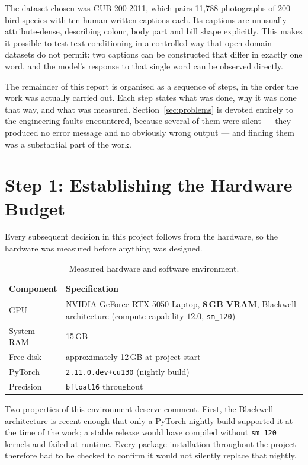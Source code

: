 \documentclass[11pt,a4paper]{article}
\newcommand{\step}[1]{\section{#1}}
\begin{document}
The dataset chosen was CUB-200-2011, which pairs 11{,}788 photographs of 200
bird species with ten human-written captions each. Its captions are unusually
attribute-dense, describing colour, body part and bill shape explicitly. This
makes it possible to test text conditioning in a controlled way that open-domain
datasets do not permit: two captions can be constructed that differ in exactly
one word, and the model's response to that single word can be observed directly.

The remainder of this report is organised as a sequence of steps, in the order
the work was actually carried out. Each step states what was done, why it was
done that way, and what was measured. Section~\ref{sec:problems} is devoted
entirely to the engineering faults encountered, because several of them were
silent --- they produced no error message and no obviously wrong output --- and
finding them was a substantial part of the work.

\step{Step 1: Establishing the Hardware Budget}

Every subsequent decision in this project follows from the hardware, so the
hardware was measured before anything was designed.

\begin{table}[htbp]
\centering
\caption{Measured hardware and software environment.}
\begin{tabularx}{0.92\textwidth}{@{}lX@{}}
\toprule
\textbf{Component} & \textbf{Specification} \\
\midrule
GPU & NVIDIA GeForce RTX 5050 Laptop, \textbf{8\,GB VRAM}, Blackwell architecture (compute capability $12.0$, \texttt{sm\_120}) \\
System RAM & 15\,GB \\
Free disk & approximately 12\,GB at project start \\
PyTorch & \texttt{2.11.0.dev+cu130} (nightly build) \\
Precision & \texttt{bfloat16} throughout \\
\bottomrule
\end{tabularx}
\end{table}

Two properties of this environment deserve comment. First, the Blackwell
architecture is recent enough that only a PyTorch nightly build supported it at
the time of the work; a stable release would have compiled without
\texttt{sm\_120} kernels and failed at runtime. Every package installation
throughout the project therefore had to be checked to confirm it would not
silently replace that nightly.
\end{document}
